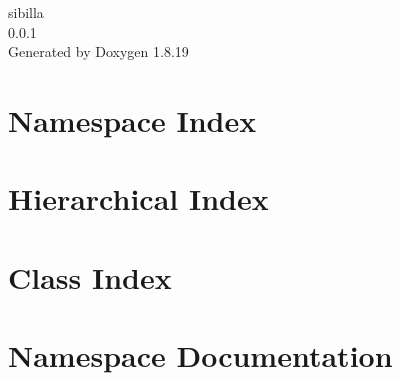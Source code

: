 \let\mypdfximage\pdfximage\def\pdfximage{\immediate\mypdfximage}\documentclass[twoside]{book}
\newcommand{\+}{\discretionary{\mbox{\scriptsize$\hookleftarrow$}}{}{}}
\newcommand{\clearemptydoublepage}{%
  \newpage{\pagestyle{empty}\cleardoublepage}%
}
\begin{document}
\hypersetup{pageanchor=false,
             bookmarksnumbered=true,
             pdfencoding=unicode
            }
\begin{titlepage}
\vspace*{7cm}
\begin{center}%
{\Large sibilla \\[1ex]\large 0.\+0.\+1 }\\
\vspace*{1cm}
{\large Generated by Doxygen 1.8.19}\\
\end{center}
\end{titlepage}
\clearemptydoublepage
{}
\tableofcontents
\clearemptydoublepage
{}
\hypersetup{pageanchor=true}

\chapter{Namespace Index}

\chapter{Hierarchical Index}

\chapter{Class Index}

\chapter{Namespace Documentation}


























\end{document}
